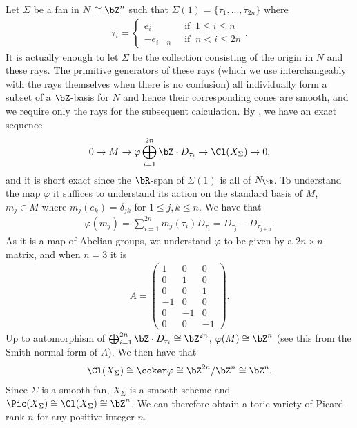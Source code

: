 \begin{homework}[e]
\begin{prf}
        Let $\Sigma$ be a fan in $N \cong \bZ^n$ such that $\Sigma(1) = \{\tau_{1},...,\tau_{2n}\}$ where
		\begin{align*}
			\tau_i = 
			\begin{cases}
				e_i & ~\text{ if } ~ 1\leq i\leq n \\
				-e_{i - n} &~\text{ if }~ n < i \leq 2n
			\end{cases}.
		\end{align*}
		It is actually enough to let $\Sigma$ be the collection consisting of the origin in $N$ and these rays. The primitive generators of these rays (which we use interchangeably with the rays themselves when there is no confusion) all individually form a subset of a $\bZ$-basis for $N$ and hence their corresponding cones are smooth, and we require only the rays for the subsequent calculation. By \cite[Theorem 4.1.3.]{Cox-Little-Schenck}, we have an exact sequence
		\begin{align*}
			0 \to M \to{\varphi} \bigoplus_{i = 1}^{2n} \bZ\cdot D_{\tau_i} \to \Cl(X_\Sigma) \to 0,
		\end{align*}
		and it is short exact since the $\bR$-span of $\Sigma(1)$ is all of $N_\bR$. To understand the map $\varphi$ it suffices to understand its action on the standard basis of $M$, $m_j \in M$ where $m_j(e_k) = \delta_{jk}$ for $1\leq j,k \leq n$. We have that
		\begin{align*}
			\varphi(m_j) = \sum_{i=1}^{2n}m_j(\tau_i)D_{\tau_i} = D_{\tau_j} - D_{\tau_{j + n}}.
		\end{align*}
		As it is a map of Abelian groups, we understand $\varphi$ to be given by a $2n \times n$ matrix, and when $n = 3$ it is
		\begin{align*}
			A = \begin{pmatrix}	
				1 & 0 & 0 \\
				0 & 1 & 0 \\
				0 & 0 & 1 \\
				-1 & 0 & 0 \\
				0 & -1 & 0 \\
				0 & 0 & -1
			\end{pmatrix}.
		\end{align*}
		Up to automorphism of $\bigoplus_{i = 1}^{2n} \bZ\cdot D_{\tau_i} \cong \bZ^{2n}$, $\varphi(M) \cong \bZ^n$ (see this from the Smith normal form of $A$). We then have that
		\begin{align*}
			\Cl(X_\Sigma) \cong \coker \varphi \cong \bZ^{2n}/\bZ^n \cong \bZ^n.
		\end{align*}
		Since $\Sigma$ is a smooth fan, $X_\Sigma$ is a smooth scheme and $\Pic(X_\Sigma) \cong \Cl(X_\Sigma) \cong \bZ^n$. We can therefore obtain a toric variety of Picard rank $n$ for any positive integer $n$.
		

\end{prf}
\end{homework}
